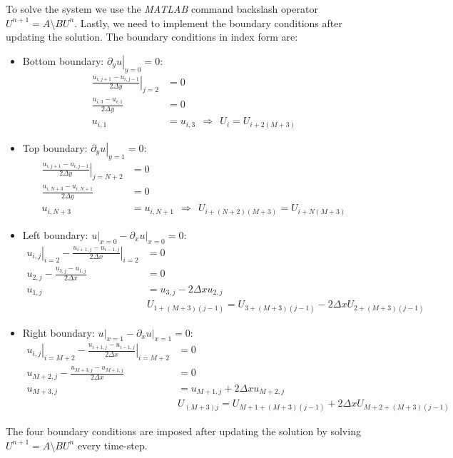 \begin{questions}
\begin{solution}
To solve the system we use the \textsl{MATLAB} command backslash operator $U^{n+1}=A$\textbackslash $BU^{n}$. Lastly, we need to implement the boundary conditions after updating the solution. The boundary conditions in index form are:
\begin{itemize}
\item Bottom boundary: $\left.\partial_yu\right|_{y=0} = 0$:
\begin{align*}
\left.\frac{u_{i,j+1}-u_{i,j-1}}{2\Delta y}\right|_{j=2} &= 0 \\
\frac{u_{i,3}-u_{i,1}}{2\Delta y} &= 0\\
u_{i,1} &= u_{i,3} ~~ \Rightarrow ~~ \boxed{U_{i} = U_{i+2(M+3)}}
\end{align*}
\item Top boundary: $\left.\partial_yu\right|_{y=1} = 0$:
\begin{align*}
\left.\frac{u_{i,j+1}-u_{i,j-1}}{2\Delta y}\right|_{j=N+2} &= 0\\
\frac{u_{i,N+3}-u_{i,N+1}}{2\Delta y} &= 0 \\
u_{i,N+3} &= u_{i,N+1} ~~ \Rightarrow ~~ \boxed{U_{i+(N+2)(M+3)} = U_{i+N(M+3)}}
\end{align*}
\item Left boundary: $\left.u\right|_{x=0} - \left.\partial_xu\right|_{x=0} = 0$:
\begin{align*}
\left.u_{i,j}\right|_{i=2}-\left.\frac{u_{i+1,j}-u_{i-1,j}}{2\Delta x}\right|_{i=2} &= 0 \\
u_{2,j}-\frac{u_{3,j}-u_{1,j}}{2\Delta x} &= 0 \\
u_{1,j} &= u_{3,j} - 2\Delta x u_{2,j} \\
&\boxed{U_{1+(M+3)(j-1)} = U_{3+(M+3)(j-1)}-2\Delta xU_{2+(M+3)(j-1)}}
\end{align*}
\item Right boundary: $\left.u\right|_{x=1} - \left.\partial_xu\right|_{x=1} = 0$:
\begin{align*}
\left.u_{i,j}\right|_{i=M+2}-\left.\frac{u_{i+1,j}-u_{i-1,j}}{2\Delta x}\right|_{i=M+2} &= 0 \\
u_{M+2,j}-\frac{u_{M+3,j}-u_{M+1,j}}{2\Delta x} &= 0 \\
u_{M+3,j} &= u_{M+1,j} + 2\Delta x u_{M+2,j} \\
&\boxed{U_{(M+3)j} = U_{M+1+(M+3)(j-1)}+2\Delta xU_{M+2+(M+3)(j-1)}}
\end{align*}
\end{itemize}
The four boundary conditions are imposed after updating the solution by solving $U^{n+1}=A$\textbackslash $BU^{n}$ every time-step.
\end{solution}
\end{questions}